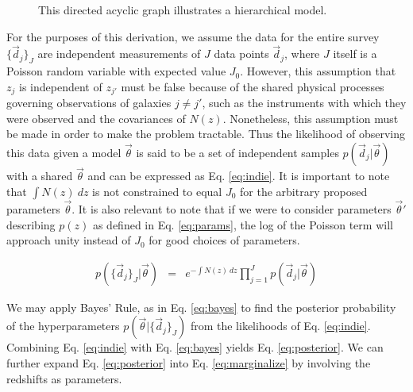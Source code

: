 \documentclass[12pt, onecolumn]{emulateapj}
\begin{document}
\begin{figure}
\label{fig:flow}
\vspace{0.5cm}
\begin{center}
\caption{This directed acyclic graph illustrates a hierarchical model.}
\end{center}
\end{figure}

For the purposes of this derivation, we assume the data for the entire survey $\{\vec{d}_{j}\}_{J}$ are independent measurements of $J$ data points $\vec{d}_{j}$, where $J$ itself is a Poisson random variable with expected value $J_{0}$.  However, this assumption that $z_{j}$ is independent of $z_{j'}$ must be false because of the shared physical processes governing observations of galaxies $j\neq j'$, such as the instruments with which they were observed and the covariances of $N(z)$.  Nonetheless, this assumption must be made in order to make the problem tractable.  Thus the likelihood of observing this data given a model $\vec{\theta}$ is said to be a set of independent samples $p(\vec{d}_{j}|\vec{\theta})$ with a shared $\vec{\theta}$ and can be expressed as Eq. \ref{eq:indie}.  \citep{for14}  It is important to note that $\int N(z)\ dz$ is not constrained to equal $J_{0}$ for the arbitrary proposed parameters $\vec{\theta}$.  It is also relevant to note that if we were to consider parameters $\vec{\theta}'$ describing $p(z)$ as defined in Eq. \ref{eq:params}, the log of the Poisson term will approach unity instead of $J_{0}$ for good choices of parameters.

\begin{eqnarray}
\label{eq:indie}
p(\{\vec{d}_{j}\}_{J}|\vec{\theta}) &=& e^{-\int N(z)\ dz}\prod_{j=1}^{J}p(\vec{d}_{j}|\vec{\theta})
\end{eqnarray}

We may apply Bayes' Rule, as in Eq. \ref{eq:bayes} to find the posterior probability of the hyperparameters $p(\vec{\theta}|\{\vec{d}_{j}\}_{J})$ from the likelihoods of Eq. \ref{eq:indie}.  Combining Eq. \ref{eq:indie} with Eq. \ref{eq:bayes} yields Eq. \ref{eq:posterior}.  We can further expand Eq. \ref{eq:posterior} into Eq. \ref{eq:marginalize} by involving the redshifts as parameters.
\end{document}
